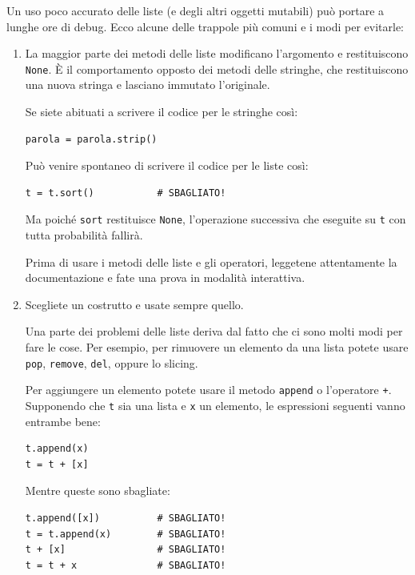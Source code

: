 \documentclass[10pt]{book}
\begin{document}
Un uso poco accurato delle liste (e degli altri oggetti mutabili) può portare a lunghe ore di debug. Ecco alcune delle trappole più comuni e i modi per evitarle:

\begin{enumerate}

\item La maggior parte dei metodi delle liste modificano l'argomento e restituiscono {\tt None}.  È il comportamento opposto dei metodi delle stringhe, che restituiscono una nuova stringa e lasciano immutato l'originale.

Se siete abituati a scrivere il codice per le stringhe così:

\begin{verbatim}
parola = parola.strip()
\end{verbatim}

Può venire spontaneo di scrivere il codice per le liste così:

\begin{verbatim}
t = t.sort()           # SBAGLIATO!
\end{verbatim}

Ma poiché {\tt sort} restituisce {\tt None}, l'operazione successiva che eseguite su {\tt t} con tutta probabilità fallirà.

Prima di usare i metodi delle liste e gli operatori, leggetene attentamente la documentazione e fate una prova in modalità interattiva.


\item Scegliete un costrutto e usate sempre quello.

Una parte dei problemi delle liste deriva dal fatto che ci sono molti modi per fare le cose. Per esempio, per rimuovere un elemento da una lista potete usare {\tt pop}, {\tt remove}, {\tt del}, oppure lo slicing.

Per aggiungere un elemento potete usare il metodo {\tt append} o l'operatore {\tt +}. Supponendo che {\tt t} sia una lista e {\tt x} un elemento, le espressioni seguenti vanno entrambe bene:

\begin{verbatim}
t.append(x)
t = t + [x]
\end{verbatim}

Mentre queste sono sbagliate:

\begin{verbatim}
t.append([x])          # SBAGLIATO!
t = t.append(x)        # SBAGLIATO!
t + [x]                # SBAGLIATO!
t = t + x              # SBAGLIATO!
\end{verbatim}


\end{enumerate}
\end{document}
